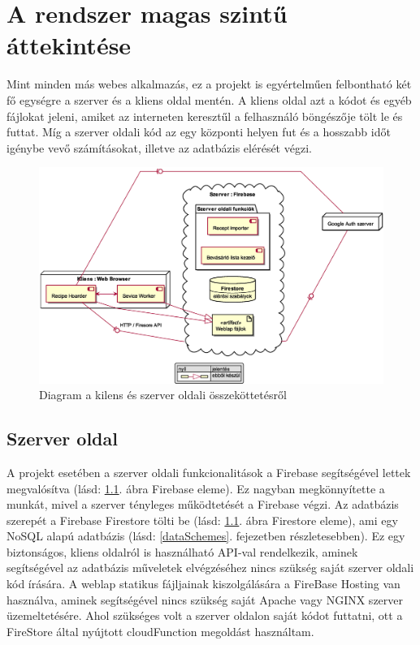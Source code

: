 \documentclass[12pt]{report}
\theoremstyle{definition}
\begin{document}
\chapter{A rendszer magas szintű áttekintése}
\label{systemExplanation}
Mint minden más webes alkalmazás, ez a projekt is egyértelműen felbontható két fő egységre a szerver és a kliens oldal mentén. 
A kliens oldal azt a kódot és egyéb fájlokat jeleni, amiket az interneten keresztűl a felhasználó böngészője tölt le és futtat. 
Míg a szerver oldali kód az egy központi helyen fut és a hosszabb időt igénybe vevő számításokat, illetve az adatbázis elérését végzi.

\noindent
\begin{figure}[H]
	\centering
	\includegraphics[width=\textwidth]{out/diagrams/deployment/deployment.eps}
	\caption{Diagram a kilens és szerver oldali összeköttetésről}
    \label{fig:deployment}
\end{figure}

\section{Szerver oldal}
A projekt esetében a szerver oldali funkcionalitások a Firebase segítségével lettek megvalósítva (lásd: \ref{fig:deployment}. ábra Firebase eleme). 
Ez nagyban megkönnyítette a munkát, mivel a szerver tényleges működtetését a Firebase végzi. 
Az adatbázis szerepét a Firebase Firestore tölti be (lásd: \ref{fig:deployment}.  ábra Firestore eleme), ami egy NoSQL alapú adatbázis (lásd: \ref{dataSchemes}. fejezetben részletesebben).  Ez egy biztonságos, kliens oldalról is használható API-val rendelkezik, aminek segítségével az adatbázis műveletek elvégzéséhez nincs szükség saját szerver oldali kód írására. A weblap statikus fájljainak kiszolgálására a FireBase Hosting van használva, aminek segítségével nincs szükség saját \Gls{Apache} vagy \Gls{NGINX} szerver üzemeltetésére. Ahol szükséges volt a szerver oldalon saját kódot futtatni, ott a FireStore által nyújtott \gls{cloudFunction} megoldást használtam.
\end{document}
